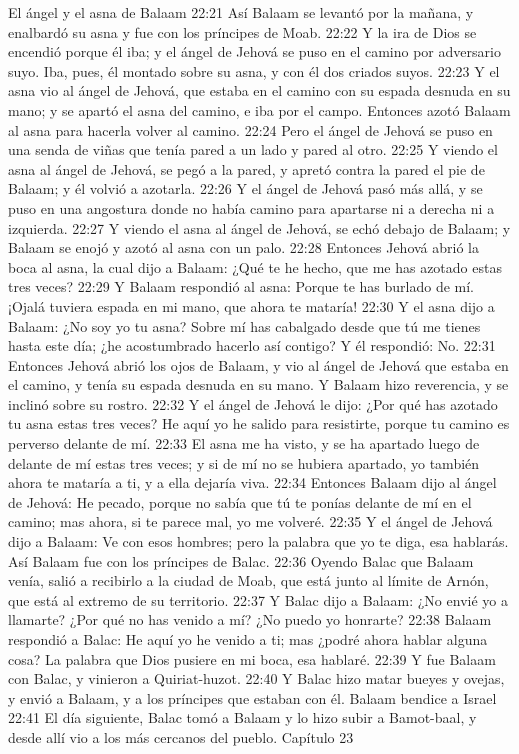 El ángel y el asna de Balaam  
22:21 Así Balaam se levantó por la mañana, y enalbardó su asna y fue con los príncipes de Moab.  
22:22 Y la ira de Dios se encendió porque él iba; y el ángel de Jehová se puso en el camino por adversario suyo. Iba, pues, él montado sobre su asna, y con él dos criados suyos.  
22:23 Y el asna vio al ángel de Jehová, que estaba en el camino con su espada desnuda en su mano; y se apartó el asna del camino, e iba por el campo. Entonces azotó Balaam al asna para hacerla volver al camino.  
22:24 Pero el ángel de Jehová se puso en una senda de viñas que tenía pared a un lado y pared al otro.  
22:25 Y viendo el asna al ángel de Jehová, se pegó a la pared, y apretó contra la pared el pie de Balaam; y él volvió a azotarla.  
22:26 Y el ángel de Jehová pasó más allá, y se puso en una angostura donde no había camino para apartarse ni a derecha ni a izquierda.  
22:27 Y viendo el asna al ángel de Jehová, se echó debajo de Balaam; y Balaam se enojó y azotó al asna con un palo.  
22:28 Entonces Jehová abrió la boca al asna, la cual dijo a Balaam: ¿Qué te he hecho, que me has azotado estas tres veces?  
22:29 Y Balaam respondió al asna: Porque te has burlado de mí. ¡Ojalá tuviera espada en mi mano, que ahora te mataría!  
22:30 Y el asna dijo a Balaam: ¿No soy yo tu asna? Sobre mí has cabalgado desde que tú me tienes hasta este día; ¿he acostumbrado hacerlo así contigo? Y él respondió: No.  
22:31 Entonces Jehová abrió los ojos de Balaam, y vio al ángel de Jehová que estaba en el camino, y tenía su espada desnuda en su mano. Y Balaam hizo reverencia, y se inclinó sobre su rostro.  
22:32 Y el ángel de Jehová le dijo: ¿Por qué has azotado tu asna estas tres veces? He aquí yo he salido para resistirte, porque tu camino es perverso delante de mí.  
22:33 El asna me ha visto, y se ha apartado luego de delante de mí estas tres veces; y si de mí no se hubiera apartado, yo también ahora te mataría a ti, y a ella dejaría viva.  
22:34 Entonces Balaam dijo al ángel de Jehová: He pecado, porque no sabía que tú te ponías delante de mí en el camino; mas ahora, si te parece mal, yo me volveré.  
22:35 Y el ángel de Jehová dijo a Balaam: Ve con esos hombres; pero la palabra que yo te diga, esa hablarás. Así Balaam fue con los príncipes de Balac.  
22:36 Oyendo Balac que Balaam venía, salió a recibirlo a la ciudad de Moab, que está junto al límite de Arnón, que está al extremo de su territorio.  
22:37 Y Balac dijo a Balaam: ¿No envié yo a llamarte? ¿Por qué no has venido a mí? ¿No puedo yo honrarte?  
22:38 Balaam respondió a Balac: He aquí yo he venido a ti; mas ¿podré ahora hablar alguna cosa? La palabra que Dios pusiere en mi boca, esa hablaré.  
22:39 Y fue Balaam con Balac, y vinieron a Quiriat-huzot.  
22:40 Y Balac hizo matar bueyes y ovejas, y envió a Balaam, y a los príncipes que estaban con él.  
Balaam bendice a Israel  
22:41 El día siguiente, Balac tomó a Balaam y lo hizo subir a Bamot-baal, y desde allí vio a los más cercanos del pueblo.  
Capítulo 23 

